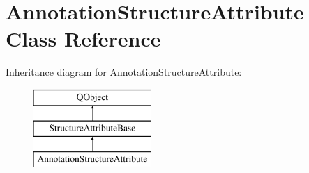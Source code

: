 \hypertarget{class_annotation_structure_attribute}{}\section{Annotation\+Structure\+Attribute Class Reference}
\label{class_annotation_structure_attribute}
Inheritance diagram for Annotation\+Structure\+Attribute\+:\begin{figure}[H]
\begin{center}
\leavevmode
\includegraphics[height=3.000000cm]{class_annotation_structure_attribute}
\end{center}
\end{figure}
